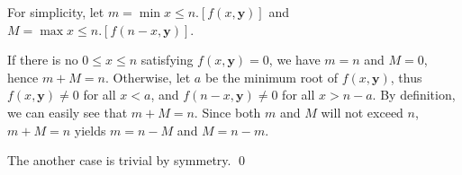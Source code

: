 
\begin{pf} \rm
 For simplicity, let $m=\min x\leq n.[f(x,\mathbf{y})]$ and $M=\max x\leq n.[f(n - x,\mathbf{y})]$.

If there is no $0\leq x\leq n$ satisfying $f(x,\mathbf{y})=0$, we have $m=n$ and $M=0$, hence
$m + M = n$. Otherwise, let $a$ be the minimum root of $f(x, \mathbf{y})$, thus 
$f(x, \mathbf{y})\neq 0$ for all $x<a$, and  $f(n - x, \mathbf{y})\neq 0$ for all $x > n - a$.
By definition, we can easily see that $m+M=n$. Since both $m$ and $M$ will not exceed $n$, 
$m+M=n$ yields $m = n - M$ and $M = n - m$. 

The another case is trivial by symmetry. \qed
\end{pf}
